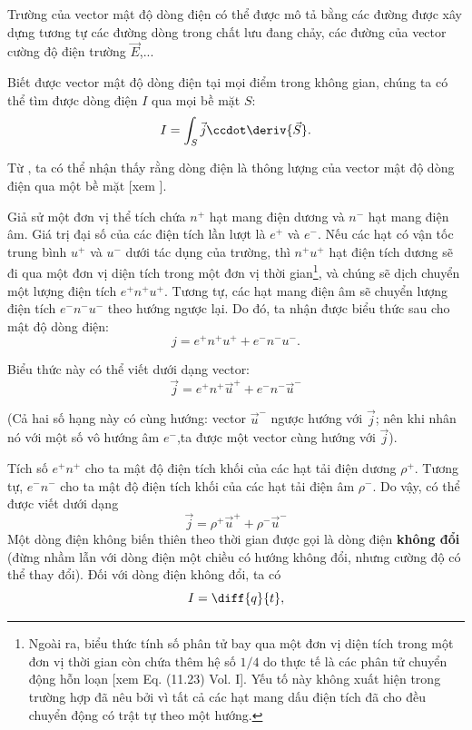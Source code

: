 Trường của vector mật độ dòng điện có thể được mô tả bằng các đường được xây dựng tương tự các đường dòng trong chất lưu đang chảy, các đường của vector cường độ điện trường $\vec{E}$,...%

Biết được vector mật độ dòng điện tại mọi điểm trong không gian, chúng ta có thể tìm được dòng điện $I$ qua mọi bề mặt $S$:
\begin{equation}\label{eq:5_3}
    I = \int_S \vec{j} \ccdot \deriv{\vec{S}}.
\end{equation}

\noindent
Từ , ta có thể nhận thấy rằng dòng điện là thông lượng của vector mật độ dòng điện qua một bề mặt [xem ].

Giả sử một đơn vị thể tích chứa $n^+$ hạt mang điện dương và $n^-$ hạt mang điện âm. Giá trị đại số của các điện tích lần lượt là $e^+$ và $e^-$. Nếu các hạt có vận tốc trung bình $u^+$ và $u^-$ dưới tác dụng của trường, thì $n^+u^+$ hạt điện tích dương sẽ đi qua một đơn vị diện tích trong một đơn vị thời gian\footnote{Ngoài ra, biểu thức tính số phân tử bay qua một đơn vị diện tích trong một đơn vị thời gian còn chứa thêm hệ số $1/4$ do thực tế là các phân tử chuyển động hỗn loạn [xem Eq. (11.23) Vol. I]. Yếu tố này không xuất hiện trong trường hợp đã nêu bởi vì tất cả các hạt mang dấu điện tích đã cho đều chuyển động có trật tự theo một hướng.}, và chúng sẽ dịch chuyển một lượng điện tích $e^+n^+u^+$. Tương tự, các hạt mang điện âm sẽ chuyển lượng điện tích $e^-n^-u^-$ theo hướng ngược lại. Do đó, ta nhận được biểu thức sau cho mật độ 
dòng điện:
\begin{equation}\label{eq:5_4}
    j = e^+n^+u^+ + e^-n^-u^-.
\end{equation}

\noindent
Biểu thức này có thể viết dưới dạng vector:
\begin{equation}\label{eq:5_5}
    \vec{j} = e^+ n^+ \vec{u}^+ + e^- n^- \vec{u}^-
\end{equation}

\noindent
(Cả hai số hạng này có cùng hướng: vector $\vec{u}^-$ ngược hướng với $\vec{j}$; nên khi nhân nó với một số vô hướng âm $e^-$,ta được một  vector cùng hướng với $\vec{j}$).

Tích số $e^+n^+$ cho ta mật độ điện tích khối của các hạt tải điện dương $\rho^+$. Tương tự, $e^-n^-$ cho ta mật độ điện tích khối của các hạt tải điện âm $\rho^-$. Do vậy,  có thể được viết dưới dạng
\begin{equation}\label{eq:5_6}
    \vec{j} = \rho^+ \vec{u}^+ + \rho^- \vec{u}^-
\end{equation}
Một dòng điện không biến thiên theo thời gian được gọi là dòng điện \textbf{không đổi} (đừng nhầm lẫn với dòng điện một chiều có hướng không đổi, nhưng cường độ có thể thay đổi). Đối với dòng điện không đổi, ta có
\begin{equation}\label{eq:5_7}
    I = \diff{q}{t},
\end{equation}

